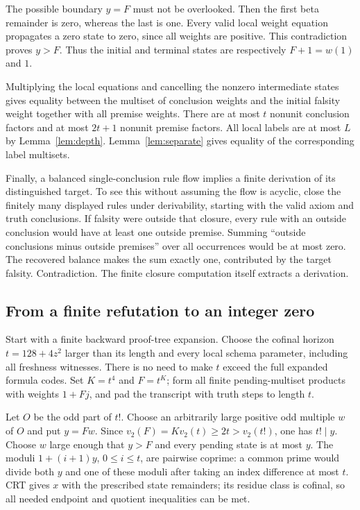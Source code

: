 \documentclass[11pt]{article}
\theoremstyle{definition}\newtheorem{remark}[theorem]{Remark}
\begin{document}
The possible boundary $y=F$ must not be overlooked. Then the first beta
remainder is zero, whereas the last is one. Every valid local weight
equation propagates a zero state to zero, since all weights are positive.
This contradiction proves $y>F$. Thus the initial and terminal states
are respectively $F+1=w(1)$ and $1$.

Multiplying the local equations and cancelling the nonzero intermediate
states gives equality between the multiset of conclusion weights and
the initial falsity weight together with all premise weights. There are
at most $t$ nonunit conclusion factors and at most $2t+1$ nonunit premise
factors. All local labels are at most $L$ by Lemma~\ref{lem:depth}.
Lemma~\ref{lem:separate} gives equality of the corresponding label
multisets.

Finally, a balanced single-conclusion rule flow implies a finite
derivation of its distinguished target. To see this without assuming the
flow is acyclic, close the finitely many displayed rules under derivability,
starting with the valid axiom and truth conclusions. If falsity were outside
that closure, every rule with an outside conclusion would have at least one
outside premise. Summing ``outside conclusions minus outside premises''
over all occurrences would be at most zero. The recovered balance makes
the sum exactly one, contributed by the target falsity. Contradiction.
The finite closure computation itself extracts a derivation.

\subsection{From a finite refutation to an integer zero}

Start with a finite backward proof-tree expansion. Choose the cofinal
horizon $t=128+4z^2$ larger than its length and every local schema
parameter, including all freshness witnesses. There is no need to make
$t$ exceed the full expanded formula codes. Set $K=t^4$ and $F=t^K$;
form all finite pending-multiset products with weights $1+Fj$, and pad
the transcript with truth steps to length $t$.

Let $O$ be the odd part of $t!$. Choose an arbitrarily large positive odd
multiple $w$ of $O$ and put $y=Fw$. Since
$v_2(F)=K v_2(t)\ge2t>v_2(t!)$, one has $t!\mid y$.
Choose $w$ large enough that $y>F$ and every pending state is at most $y$.
The moduli $1+(i+1)y$, $0\le i\le t$, are pairwise coprime: a
common prime would divide both $y$ and one of these moduli after taking
an index difference at most $t$. CRT gives $x$ with the prescribed state
remainders; its residue class is cofinal, so all needed endpoint and
quotient inequalities can be met.
\end{document}
